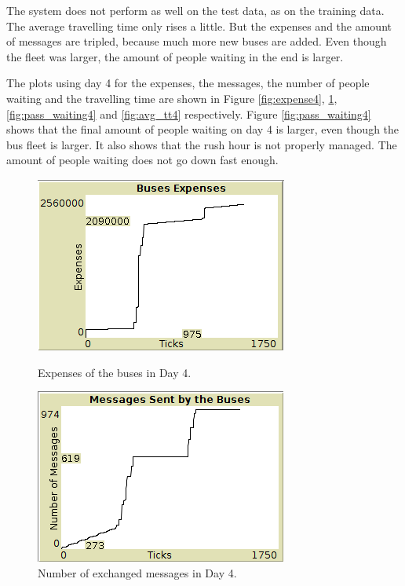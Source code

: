 \begin{table}[htbp]

The system does not perform as well on the test data, as on the training data. The average travelling time only rises a little. But the expenses and the amount of messages are tripled, because much more new buses are added. Even though the fleet was larger, the amount of people waiting in the end is larger. 

The plots using day 4 for the expenses, the messages, the number of people waiting and the travelling time are shown in Figure \ref{fig:expense4}, \ref{fig:messages4}, \ref{fig:pass_waiting4} and \ref{fig:avg_tt4} respectively. Figure \ref{fig:pass_waiting4} shows that the final amount of people waiting on day 4 is larger, even though the bus fleet is larger. It also shows that the rush hour is not properly managed. The amount of people waiting does not go down fast enough.

\begin{figure}[htbp]
\centering
\begin{minipage}{.48\textwidth}
  \includegraphics[width=\textwidth]{src/expenses4.png}
  \caption{Expenses of the buses in Day 4.}
  \label{fig:expense4}
\end{minipage}
\begin{minipage}{.48\textwidth}
  \includegraphics[width=\textwidth]{src/nr_messages4.png}
  \caption{Number of exchanged messages in Day 4.}
  \label{fig:messages4}
\end{minipage}
\end{figure}


\end{table}
